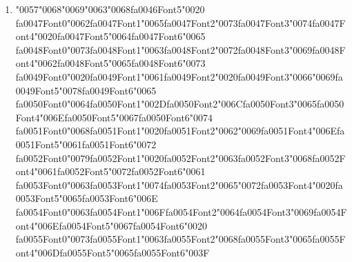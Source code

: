 \documentclass[11pt]{article}
\begin{document}
\begin{enumerate}[leftmargin=*]
    \textbf{A.} A task that identifies predicates in a sentence and labels roles of elements such as agent, theme, or location
    \textbf{B.} A process that assigns grammatical roles like subject and object based on syntactic structure
    \textbf{C.} A method that classifies named entities and links them to a knowledge base
    \textbf{D.} A technique that labels words with their parts of speech and morphological features

  \item {\char"0057}{\char"0068}{\char"0069}{\char"0063}{\char"0068}{\csname fa0046Font5\endcsname\char"0020} {\csname fa0047Font0\endcsname\char"0062}{\csname fa0047Font1\endcsname\char"0065}{\csname fa0047Font2\endcsname\char"0073}{\csname fa0047Font3\endcsname\char"0074}{\csname fa0047Font4\endcsname\char"0020}{\csname fa0047Font5\endcsname\char"0064}{\csname fa0047Font6\endcsname\char"0065} {\csname fa0048Font0\endcsname\char"0073}{\csname fa0048Font1\endcsname\char"0063}{\csname fa0048Font2\endcsname\char"0072}{\csname fa0048Font3\endcsname\char"0069}{\csname fa0048Font4\endcsname\char"0062}{\csname fa0048Font5\endcsname\char"0065}{\csname fa0048Font6\endcsname\char"0073} {\csname fa0049Font0\endcsname\char"0020}{\csname fa0049Font1\endcsname\char"0061}{\csname fa0049Font2\endcsname\char"0020}{\csname fa0049Font3\endcsname\char"0066}{\char"0069}{\csname fa0049Font5\endcsname\char"0078}{\csname fa0049Font6\endcsname\char"0065} {\csname fa0050Font0\endcsname\char"0064}{\csname fa0050Font1\endcsname\char"002D}{\csname fa0050Font2\endcsname\char"006C}{\csname fa0050Font3\endcsname\char"0065}{\csname fa0050Font4\endcsname\char"006E}{\csname fa0050Font5\endcsname\char"0067}{\csname fa0050Font6\endcsname\char"0074} {\csname fa0051Font0\endcsname\char"0068}{\csname fa0051Font1\endcsname\char"0020}{\csname fa0051Font2\endcsname\char"0062}{\char"0069}{\csname fa0051Font4\endcsname\char"006E}{\csname fa0051Font5\endcsname\char"0061}{\csname fa0051Font6\endcsname\char"0072} {\csname fa0052Font0\endcsname\char"0079}{\csname fa0052Font1\endcsname\char"0020}{\csname fa0052Font2\endcsname\char"0063}{\csname fa0052Font3\endcsname\char"0068}{\csname fa0052Font4\endcsname\char"0061}{\csname fa0052Font5\endcsname\char"0072}{\csname fa0052Font6\endcsname\char"0061} {\csname fa0053Font0\endcsname\char"0063}{\csname fa0053Font1\endcsname\char"0074}{\csname fa0053Font2\endcsname\char"0065}{\char"0072}{\csname fa0053Font4\endcsname\char"0020}{\csname fa0053Font5\endcsname\char"0065}{\csname fa0053Font6\endcsname\char"006E} {\csname fa0054Font0\endcsname\char"0063}{\csname fa0054Font1\endcsname\char"006F}{\csname fa0054Font2\endcsname\char"0064}{\csname fa0054Font3\endcsname\char"0069}{\csname fa0054Font4\endcsname\char"006E}{\csname fa0054Font5\endcsname\char"0067}{\csname fa0054Font6\endcsname\char"0020} {\csname fa0055Font0\endcsname\char"0073}{\csname fa0055Font1\endcsname\char"0063}{\csname fa0055Font2\endcsname\char"0068}{\csname fa0055Font3\endcsname\char"0065}{\csname fa0055Font4\endcsname\char"006D}{\csname fa0055Font5\endcsname\char"0065}{\csname fa0055Font6\endcsname\char"003F}

\end{enumerate}
\end{document}
